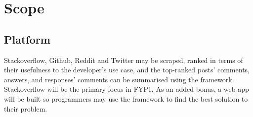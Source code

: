 



\vspace{1cm}
\section{Scope}
\subsection*{Platform}
Stackoverflow, Github, Reddit and Twitter may be scraped, ranked in terms of their usefulness to the developer's use case, and the top-ranked posts' comments, answers, and responses' comments can be summarised using the framework. Stackoverflow will be the primary focus in FYP1. As an added bonus, a web app will be built so programmers may use the framework to find the best solution to their problem.

